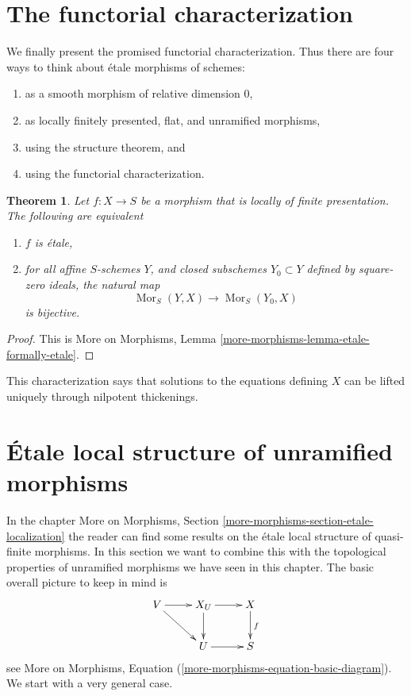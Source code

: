 \documentclass{stacks-project}
\theoremstyle{plain}
\newtheorem{theorem}[subsection]{Theorem}
\theoremstyle{definition}
\theoremstyle{remark}
\numberwithin{equation}{subsection}
\def\Mor{\mathop{\mathrm{Mor}}\nolimits}
\begin{document}
\section{The functorial characterization}
\label{section-functorial-etale}

\noindent
We finally present the promised functorial characterization.
Thus there are four ways to think about \'etale morphisms of schemes:
\begin{enumerate}
\item as a smooth morphism of relative dimension $0$,
\item as locally finitely presented, flat, and unramified morphisms,
\item using the structure theorem, and
\item using the functorial characterization.
\end{enumerate}

\begin{theorem}
\label{theorem-formally-etale}
Let $f : X \to S$ be a morphism that is locally of finite presentation.
The following are equivalent
\begin{enumerate}
\item $f$ is \'etale,
\item for all affine $S$-schemes $Y$, and closed subschemes $Y_0 \subset Y$
defined by square-zero ideals, the natural map
$$
\Mor_S(Y, X) \longrightarrow \Mor_S(Y_0, X)
$$
is bijective.
\end{enumerate}
\end{theorem}

\begin{proof}
This is
More on Morphisms, Lemma \ref{more-morphisms-lemma-etale-formally-etale}.
\end{proof}

\noindent
This characterization says that solutions to the equations defining $X$ can
be lifted uniquely through nilpotent thickenings.



\section{\'Etale local structure of unramified morphisms}
\label{section-unramified-etale-local}

\noindent
In the chapter
More on Morphisms, Section \ref{more-morphisms-section-etale-localization}
the reader can find some results on the \'etale local structure of
quasi-finite morphisms. In this section we want to combine this
with the topological properties of unramified morphisms we have seen
in this chapter. The basic overall picture to keep in mind is
$$
\xymatrix{
V \ar[r] \ar[dr] & X_U \ar[d] \ar[r] & X \ar[d]^f \\
& U \ar[r] & S
}
$$
see
More on Morphisms, Equation (\ref{more-morphisms-equation-basic-diagram}).
We start with a very general case.
\end{document}
